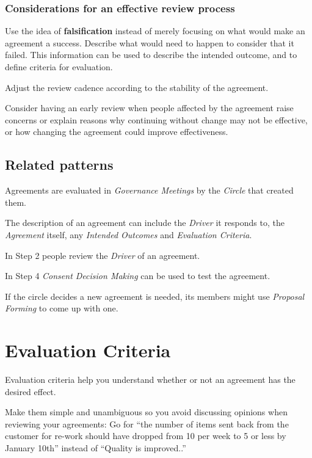 \subsubsection{Considerations for an effective review process}
\label{considerationsforaneffectivereviewprocess}

Use the idea of \textbf{falsification} instead of merely focusing on what would make an agreement a success. Describe what would need to happen to consider that it failed. This information can be used to describe the intended outcome, and to define criteria for evaluation.

Adjust the review cadence according to the stability of the agreement.

Consider having an early review when people affected by the agreement raise concerns or explain reasons why continuing without change may not be effective, or how changing the agreement could improve effectiveness.

\subsection{Related patterns}
\label{relatedpatterns}

Agreements are evaluated in \emph{Governance Meetings} by the \emph{Circle} that created them.

The description of an agreement can include the \emph{Driver} it responds to, the \emph{Agreement} itself, any \emph{Intended Outcomes} and \emph{Evaluation Criteria}.

In Step 2 people review the \emph{Driver} of an agreement.

In Step 4 \emph{Consent Decision Making} can be used to test the agreement.

If the circle decides a new agreement is needed, its members might use \emph{Proposal Forming} to come up with one.

\section{Evaluation Criteria}
\label{evaluationcriteria}

Evaluation criteria help you understand whether or not an agreement has the desired effect.

Make them simple and unambiguous so you avoid discussing opinions when reviewing your agreements: Go for ``the number of items sent back from the customer for re-work should have dropped from 10 per week to 5 or less by January 10th'' instead of ``Quality is improved..''


